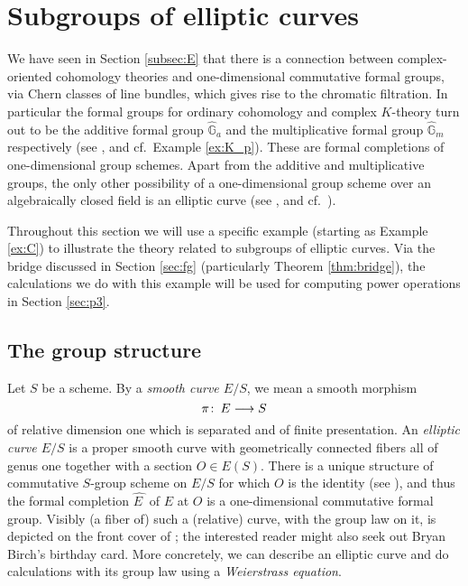 \documentclass{gtpart}
\theoremstyle{definition}
\theoremstyle{remark}
\def\co{\colon\thinspace}
\newcommand{\mb}[1]{\mathbb{#1}}
\newcommand{\HGa}{{\widehat{\mb G}_a}}
\newcommand{\HGm}{{\widehat{\mb G}_m}}
\newcommand{\HE}{\widehat{E~}\!}
\numberwithin{equation}{section}
\numberwithin{thm}{section}
\begin{document}
\section{Subgroups of elliptic curves}
\label{sec:ec}

We have seen in Section \ref{subsec:E} that there is a connection 
between complex-oriented cohomology theories and one-dimensional 
commutative formal groups, via Chern classes of line bundles, which 
gives rise to the chromatic filtration.  In particular the formal groups 
for ordinary cohomology and complex $K$-theory turn out to be the 
additive formal group $\HGa$ and the multiplicative formal group $\HGm$ 
respectively (see \cite[Example 2.14, and Sections 1 and 7]{coctalos}, 
and cf.~Example \ref{ex:K_p}).  These are formal completions of 
one-dimensional group schemes.  Apart from the additive and 
multiplicative groups, the only other possibility of a one-dimensional 
group scheme over an algebraically closed field is an elliptic curve 
(see \cite[IV.1.6]{AECII}, and cf.~\cite[Section 12]{tafoverview}).  

Throughout this section we will use a specific example (starting as 
Example \ref{ex:C}) to illustrate the theory related to subgroups of 
elliptic curves.  Via the bridge discussed in Section \ref{sec:fg} 
(particularly Theorem \ref{thm:bridge}), the calculations we do with 
this example will be used for computing power operations in Section 
\ref{sec:p3}.  


\subsection{The group structure}
\label{subsec:gp}

Let $S$ be a scheme.  By a {\em smooth curve $E/S$}, we mean a smooth 
morphism 
\[
 \pi \co E \longrightarrow S 
\]
of relative dimension one which is separated and of finite presentation.  
An {\em elliptic curve $E/S$} is a proper smooth curve with 
geometrically connected fibers all of genus one together with a section 
$O \in E(S)$.  There is a unique structure of commutative $S$-group 
scheme on $E/S$ for which $O$ is the identity (see 
\cite[2.1.2 and 2.5.1]{KM}), and thus the formal completion $\HE$ of $E$ 
at $O$ is a one-dimensional commutative formal group.  Visibly (a fiber 
of) such a (relative) curve, with the group law on it, is depicted on 
the front cover of \cite[second ed.]{AEC}; the interested reader might 
also seek out Bryan Birch's birthday card.  More concretely, we can 
describe an elliptic curve and do calculations with its group law using 
a {\em Weierstrass equation}.  
\end{document}
